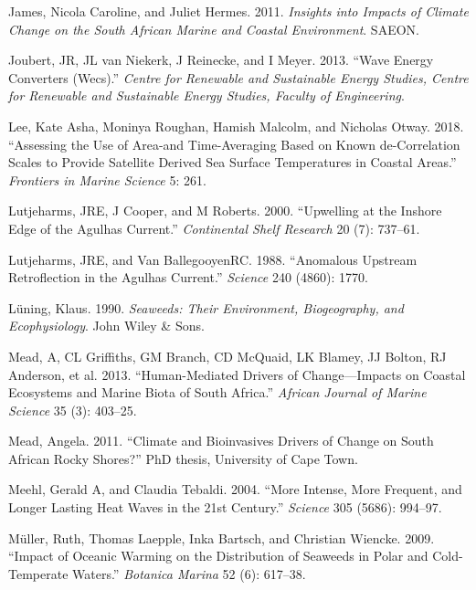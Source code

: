 \documentclass[12pt,a4paper,]{article}
\begin{document}
\leavevmode\hypertarget{ref-James2011}{}%
James, Nicola Caroline, and Juliet Hermes. 2011. \emph{Insights into
Impacts of Climate Change on the South African Marine and Coastal
Environment}. SAEON.

\leavevmode\hypertarget{ref-Joubert2013}{}%
Joubert, JR, JL van Niekerk, J Reinecke, and I Meyer. 2013. ``Wave
Energy Converters (Wecs).'' \emph{Centre for Renewable and Sustainable
Energy Studies, Centre for Renewable and Sustainable Energy Studies,
Faculty of Engineering}.

\leavevmode\hypertarget{ref-Lee2018}{}%
Lee, Kate Asha, Moninya Roughan, Hamish Malcolm, and Nicholas Otway.
2018. ``Assessing the Use of Area-and Time-Averaging Based on Known
de-Correlation Scales to Provide Satellite Derived Sea Surface
Temperatures in Coastal Areas.'' \emph{Frontiers in Marine Science} 5:
261.

\leavevmode\hypertarget{ref-Lutjeharms2000}{}%
Lutjeharms, JRE, J Cooper, and M Roberts. 2000. ``Upwelling at the
Inshore Edge of the Agulhas Current.'' \emph{Continental Shelf Research}
20 (7): 737--61.

\leavevmode\hypertarget{ref-Lutjeharms1988}{}%
Lutjeharms, JRE, and Van BallegooyenRC. 1988. ``Anomalous Upstream
Retroflection in the Agulhas Current.'' \emph{Science} 240 (4860): 1770.

\leavevmode\hypertarget{ref-Luning1990}{}%
Lüning, Klaus. 1990. \emph{Seaweeds: Their Environment, Biogeography,
and Ecophysiology}. John Wiley \& Sons.

\leavevmode\hypertarget{ref-Mead2013}{}%
Mead, A, CL Griffiths, GM Branch, CD McQuaid, LK Blamey, JJ Bolton, RJ
Anderson, et al. 2013. ``Human-Mediated Drivers of Change---Impacts on
Coastal Ecosystems and Marine Biota of South Africa.'' \emph{African
Journal of Marine Science} 35 (3): 403--25.

\leavevmode\hypertarget{ref-Mead2011}{}%
Mead, Angela. 2011. ``Climate and Bioinvasives Drivers of Change on
South African Rocky Shores?'' PhD thesis, University of Cape Town.

\leavevmode\hypertarget{ref-Meehl2004}{}%
Meehl, Gerald A, and Claudia Tebaldi. 2004. ``More Intense, More
Frequent, and Longer Lasting Heat Waves in the 21st Century.''
\emph{Science} 305 (5686): 994--97.

\leavevmode\hypertarget{ref-Muller2009}{}%
Müller, Ruth, Thomas Laepple, Inka Bartsch, and Christian Wiencke. 2009.
``Impact of Oceanic Warming on the Distribution of Seaweeds in Polar and
Cold-Temperate Waters.'' \emph{Botanica Marina} 52 (6): 617--38.
\end{document}
